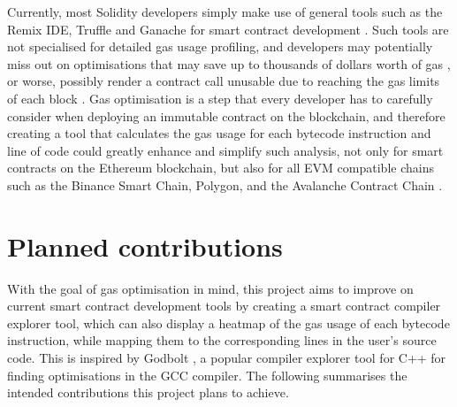 Currently, most Solidity developers simply make use of general tools such as the Remix IDE, Truffle and Ganache for
smart contract development \cite{consensystools}. Such tools are not specialised for detailed gas usage profiling, and developers
may potentially miss out on optimisations that may save up to thousands of dollars worth of gas \cite{gaschecker},
or worse, possibly render a contract call unusable due to reaching the gas limits of each block \cite{governmentalstuck}.
Gas optimisation is a step that every developer has to carefully consider when deploying an immutable contract on the blockchain,
and therefore creating a tool that calculates the gas usage for each bytecode instruction 
and line of code could greatly enhance and simplify such analysis, not only for 
smart contracts on the Ethereum blockchain, but also for all EVM compatible chains such as
the Binance Smart Chain, Polygon, and the Avalanche Contract Chain \cite{evmcompatiblechains}.

\section{Planned contributions}

With the goal of gas optimisation in mind, this project aims to improve on current 
smart contract development tools by creating a smart contract compiler explorer tool,
which can also display a heatmap of the gas usage of each bytecode instruction, while mapping
them to the corresponding lines in the user's source code. This is inspired by Godbolt \cite{godbolt},
a popular compiler explorer tool for C++ for finding optimisations in the GCC compiler.
The following summarises the intended contributions this project plans to achieve.

